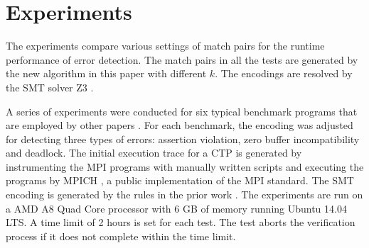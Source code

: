 \section{Experiments}
The experiments compare various settings of match pairs for the runtime performance of error detection.
The match pairs in all the tests are generated by the new algorithm in this paper with different $k$. 
The encodings are resolved by the SMT solver Z3 \cite{demoura:tacas08}. 

A series of experiments were conducted for six typical benchmark programs that are employed by other papers \cite{benchmark:fevs,mpptest_benchmark,DBLP:conf/kbse/HuangMM13,HuangDeadlock,DBLP:conf/ppopp/XueLWGCZZV09}. For each benchmark, the encoding was adjusted for detecting three types of errors: assertion violation, zero buffer incompatibility and deadlock. 
The initial execution trace for a CTP is generated by instrumenting the MPI programs with manually written scripts and executing the programs by MPICH \cite{mpich}, a public implementation of the MPI standard. The SMT encoding is generated by the rules in the prior work \cite{DBLP:conf/kbse/HuangMM13,HuangNFM15,HuangDeadlock}.
The experiments are run on a AMD A8 Quad Core processor with 6 GB of memory running Ubuntu 14.04 LTS. A time limit of 2 hours is set for each test. The test aborts the verification process if it does not complete within the time limit.

